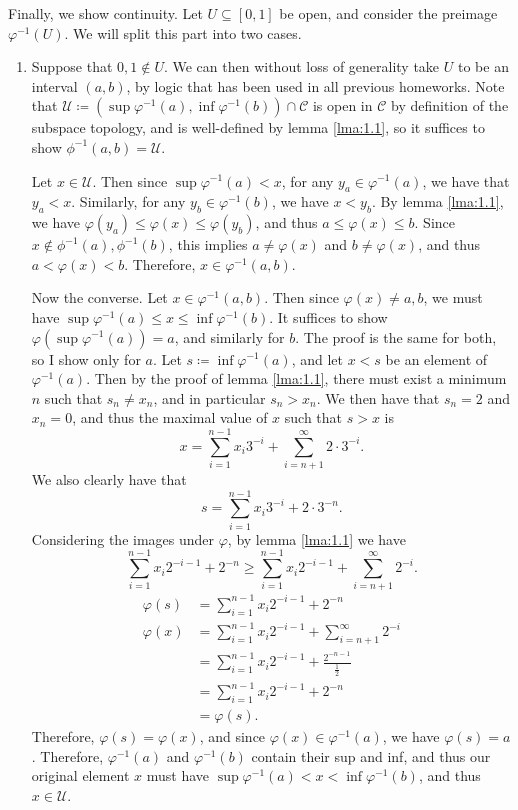 \documentclass[11pt, letterpaper]{article}
\begin{document}
Finally, we show continuity. Let $U\subseteq [0,1]$ be open, and consider the preimage $\varphi  ^{-1} (U)$. We will split this part into two cases.
\begin{enumerate}
	\item Suppose that $0,1\notin U$. We can then without loss of generality take $U$ to be an interval $(a,b)$, by logic that has been used in all previous homeworks. Note that $\mathcal{U} \coloneqq \left( \sup \varphi  ^{-1} (a),\inf \varphi  ^{-1} (b) \right) \cap \mathcal{C} $ is open in $\mathcal{C} $ by definition of the subspace topology, and is well-defined by lemma \ref{lma:1.1}, so it suffices to show $\phi ^{-1} (a,b)=\mathcal{U} $.

		Let $x\in \mathcal{U} $. Then since $\sup \varphi ^{-1} (a)<x$, for any $y_a\in \varphi ^{-1} (a)$, we have that $y_a < x$. Similarly, for any $y_b\in \varphi ^{-1} (b)$, we have $x<y_b$. By lemma \ref{lma:1.1}, we have $\varphi (y_a)\leq \varphi (x)\leq \varphi (y_b)$, and thus $a\leq \varphi (x)\leq b$. Since $x\notin \phi ^{-1} (a),\phi ^{-1} (b)$, this implies $a\neq \varphi (x)$ and $b\neq \varphi (x)$, and thus $a<\varphi (x)<b$. Therefore, $x\in \varphi ^{-1} (a,b)$.

		Now the converse. Let $x\in \varphi ^{-1} (a,b)$. Then since $\varphi (x)\neq a,b$, we must have $\sup \varphi ^{-1} (a)\leq x\leq \inf \varphi ^{-1} (b)$. It suffices to show $\varphi \left( \sup \varphi ^{-1} (a) \right) =a$, and similarly for $b$. The proof is the same for both, so I show only for $a$. Let $s\coloneqq \inf \varphi ^{-1} (a)$, and let $x<s$ be an element of $\varphi ^{-1} (a)$. Then by the proof of lemma \ref{lma:1.1}, there must exist a minimum $n$ such that $s_n\neq x_n$, and in particular $s_n > x_n$. We then have that $s_n=2$ and $x_n=0$, and thus the maximal value of $x$ such that $s>x$ is
		\[
			x=\sum_{i=1}^{n-1} x_i3^{-i} +\sum_{i=n+1}^{\infty} 2\cdot 3^{-i} 
		.\]
		We also clearly have that
		\[
			s=\sum_{i=1}^{n-1} x_i3^{-i} +2\cdot 3^{-n} 
		.\]
		Considering the images under $\varphi $, by lemma \ref{lma:1.1} we have
		\[
			\sum_{i=1}^{n-1} x_i2^{-i-1} +2^{-n} \geq \sum_{i=1}^{n-1} x_i2^{-i-1} +\sum_{i=n+1}^{\infty } 2^{-i} 
		.\]
		\begin{align*}
			\varphi (s)&=\sum_{i=1}^{n-1} x_i2^{-i-1} +2^{-n} \\
			\varphi (x)&=\sum_{i=1}^{n-1} x_i2^{-i-1} +\sum_{i=n+1}^{\infty} 2^{-i} \\
				   &=\sum_{i=1}^{n-1} x_i2^{-i-1} +\frac{2^{-n-1} }{\frac{1}{2} } \\
				   &=\sum_{i=1}^{n-1} x_i2^{-i-1} +2^{-n} \\
				   &=\varphi (s)
		.\end{align*}
		Therefore, $\varphi (s)=\varphi (x)$, and since $\varphi (x)\in \varphi ^{-1} (a)$, we have $\varphi (s)=a$. Therefore, $\varphi ^{-1} (a)$ and $\varphi ^{-1} (b)$ contain their sup and inf, and thus our original element $x$ must have $\sup \varphi ^{-1} (a)<x<\inf \varphi ^{-1} (b)$, and thus $x\in \mathcal{U} $.


\end{enumerate}
\end{document}
